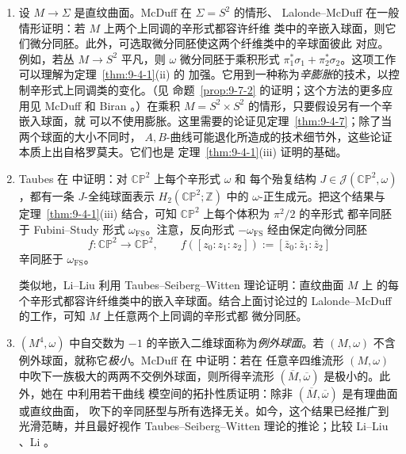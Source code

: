 \begin{remark}\label{rem:9-4-3}
\begin{enumerate}[label=(\roman*),leftmargin=3em]
\item 设 $M\to\Sigma$ 是直纹曲面。McDuff  在 $\Sigma=S^2$ 的情形、
Lalonde--McDuff  在一般情形证明：若 $M$ 上两个上同调的辛形式都容许纤维
类中的辛嵌入球面，则它们微分同胚。此外，可选取微分同胚使这两个纤维类中的辛球面彼此
对应。例如，若丛 $M\to S^2$ 平凡，则 $\omega$ 微分同胚于乘积形式
$\pi_1^*\sigma_1+\pi_2^*\sigma_2$。这项工作可以理解为定理~\ref{thm:9-4-1}(ii) 的
加强。它用到一种称为\emph{辛膨胀}的技术，以控制辛形式上同调类的变化。（见
命题~\ref{prop:9-7-2} 的证明；这个方法的更多应用见 McDuff  和 Biran
。）在乘积 $M=S^2\times S^2$ 的情形，只要假设另有一个辛嵌入球面，就
可以不使用膨胀。这里需要的论证见定理~\ref{thm:9-4-7}；除了当两个球面的大小不同时，
$A,B$-曲线可能退化所造成的技术细节外，这些论证本质上出自格罗莫夫。它们也是
定理~\ref{thm:9-4-1}(iii) 证明的基础。

\item Taubes 在  中证明：对 $\mathbb{CP}^2$ 上每个辛形式 $\omega$ 和
每个殆复结构 $J\in\mathcal J(\mathbb{CP}^2,\omega)$，都有一条 $J$-全纯球面表示
$H_2(\mathbb{CP}^2;\mathbb Z)$ 中的 $\omega$-正生成元。把这个结果与
定理~\ref{thm:9-4-1}(iii) 结合，可知 $\mathbb{CP}^2$ 上每个体积为 $\pi^2/2$ 的辛形式
都辛同胚于 Fubini--Study 形式 $\omega_{\mathrm{FS}}$。注意，反向形式
$-\omega_{\mathrm{FS}}$ 经由保定向微分同胚
\[
  f:\mathbb{CP}^2\to\mathbb{CP}^2,
  \qquad
  f([z_0:z_1:z_2]):=[\bar z_0:\bar z_1:\bar z_2]
\]
辛同胚于 $\omega_{\mathrm{FS}}$。

类似地，Li--Liu  利用 Taubes--Seiberg--Witten 理论证明：直纹曲面 $M$ 上
的每个辛形式都容许纤维类中的嵌入辛球面。结合上面讨论过的
Lalonde--McDuff  的工作，可知 $M$ 上任意两个上同调的辛形式都
微分同胚。

\item $(M^4,\omega)$ 中自交数为 $-1$ 的辛嵌入二维球面称为\emph{例外球面}。若
$(M,\omega)$ 不含例外球面，就称它\emph{极小}。McDuff 在  中证明：若在
任意辛四维流形 $(M,\omega)$ 中吹下一族极大的两两不交例外球面，则所得辛流形
$(\overline M,\overline\omega)$ 是极小的。此外，她在  中利用若干曲线
模空间的拓扑性质证明：除非 $(\overline M,\overline\omega)$ 是有理曲面或直纹曲面，
吹下的辛同胚型与所有选择无关。如今，这个结果已经推广到光滑范畴，并且最好视作
Taubes--Seiberg--Witten 理论的推论；比较 Li--Liu 、Li 。


\end{enumerate}
\end{remark}
